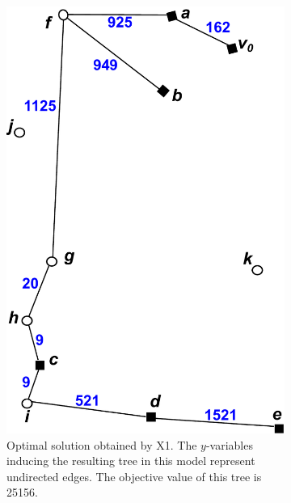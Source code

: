 \begin{figure}[!htb]
    \centering
    \begin{subfigure}[b]{0.4\textwidth}
        \includegraphics[width=\textwidth]{conBNec}
        \caption{Optimal solution obtained by X1. The $y$-variables inducing the resulting tree in this model represent undirected edges. The objective value of this tree is 25156.\newline~}
        \label{fig:BorigSMT}
    \end{subfigure}
    \hfill
    \begin{subfigure}[b]{0.4\textwidth}

\end{subfigure}
\end{figure}
